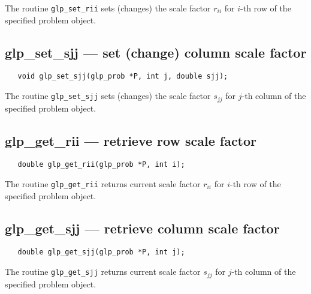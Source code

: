 \description

The routine \verb|glp_set_rii| sets (changes) the scale factor $r_{ii}$
for $i$-th row of the specified problem object.

\subsection{glp\_set\_sjj --- set (change) column scale factor}

\synopsis

\begin{verbatim}
   void glp_set_sjj(glp_prob *P, int j, double sjj);
\end{verbatim}

\description

The routine \verb|glp_set_sjj| sets (changes) the scale factor $s_{jj}$
for $j$-th column of the specified problem object.

\newpage

\subsection{glp\_get\_rii --- retrieve row scale factor}

\synopsis

\begin{verbatim}
   double glp_get_rii(glp_prob *P, int i);
\end{verbatim}

\returns

The routine \verb|glp_get_rii| returns current scale factor $r_{ii}$
for $i$-th row of the specified problem object.

\vspace*{-6pt}

\subsection{glp\_get\_sjj --- retrieve column scale factor}

\vspace*{-4pt}

\synopsis

\begin{verbatim}
   double glp_get_sjj(glp_prob *P, int j);
\end{verbatim}

\returns

The routine \verb|glp_get_sjj| returns current scale factor $s_{jj}$
for $j$-th column of the specified problem object.

